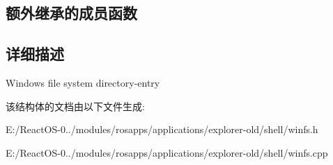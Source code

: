 \subsection*{额外继承的成员函数}


\subsection{详细描述}
Windows file system directory-\/entry 

该结构体的文档由以下文件生成\+:\begin{DoxyCompactItemize}
\item 
E\+:/\+React\+O\+S-\/0../modules/rosapps/applications/explorer-\/old/shell/winfs.\+h\item 
E\+:/\+React\+O\+S-\/0../modules/rosapps/applications/explorer-\/old/shell/winfs.\+cpp\end{DoxyCompactItemize}
